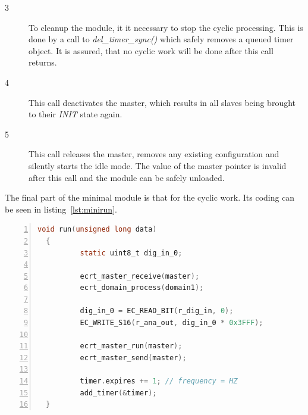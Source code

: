 \documentclass[a4paper,12pt,BCOR6mm,bibtotoc,idxtotoc]{scrbook}
\begin{document}
\begin{description}
\item[\normalfont\textcircled{\tiny 3}] To cleanup the module, it it
  necessary to stop the cyclic processing. This is done by a call to
  \textit{del\_timer\_sync()} which safely removes a queued timer
  object. It is assured, that no cyclic work will be done after this
  call returns.
\item[\normalfont\textcircled{\tiny 4}] This call deactivates the
  master, which results in all slaves being brought to their
  \textit{INIT} state again.
\item[\normalfont\textcircled{\tiny 5}] This call releases the master,
  removes any existing configuration and silently starts the idle
  mode. The value of the master pointer is invalid after this call and
  the module can be safely unloaded.
\end{description}

The final part of the minimal module is that for the cyclic work. Its
coding can be seen in listing~\ref{lst:minirun}.

\begin{lstlisting}[language=C,numbers=left,caption={Minimal cyclic
    function},label={lst:minirun}]
  void run(unsigned long data)
  {
          static uint8_t dig_in_0;

          ecrt_master_receive(master);
          ecrt_domain_process(domain1);

          dig_in_0 = EC_READ_BIT(r_dig_in, 0);
          EC_WRITE_S16(r_ana_out, dig_in_0 * 0x3FFF);

          ecrt_master_run(master);
          ecrt_master_send(master);

          timer.expires += 1; // frequency = HZ
          add_timer(&timer);
  }
\end{lstlisting}
\end{document}

